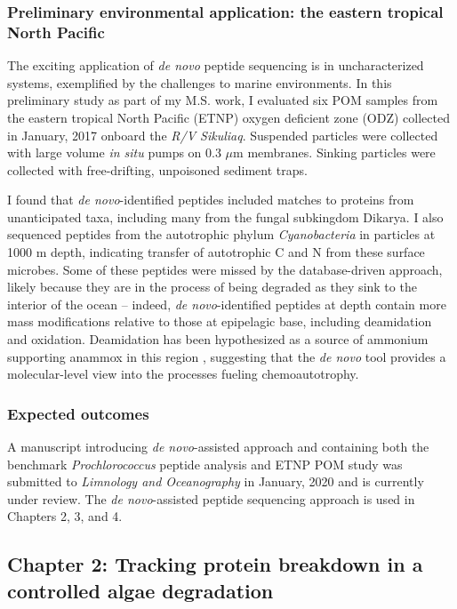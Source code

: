 \documentclass[12pt, letterpaper, twoside]{article}
\begin{document}
\subsubsection{Preliminary environmental application: the eastern tropical North Pacific}

The exciting application of \textit{de novo} peptide sequencing is in uncharacterized systems, exemplified by the challenges to marine environments. In this preliminary study as part of my M.S. work, I evaluated six POM samples from the eastern tropical North Pacific (ETNP) oxygen deficient zone (ODZ) collected in January, 2017 onboard the \textit{R/V Sikuliaq}. Suspended particles were collected with large volume \textit{in situ} pumps on 0.3 $\mu$m membranes. Sinking particles were collected with free-drifting, unpoisoned sediment traps.

I found that \textit{de novo}-identified peptides included matches to proteins from unanticipated taxa, including many from the fungal subkingdom Dikarya. I also sequenced peptides from the autotrophic phylum \textit{Cyanobacteria} in particles at 1000 m depth, indicating transfer of autotrophic C and N from these surface microbes. Some of these peptides were missed by the database-driven approach, likely because they are in the process of being degraded as they sink to the interior of the ocean – indeed, \textit{de novo}-identified peptides at depth contain more mass modifications relative to those at epipelagic base, including deamidation and oxidation. Deamidation has been hypothesized as a source of ammonium supporting anammox in this region \cite{van_mooy_impact_2002}, suggesting that the \textit{de novo} tool provides a molecular-level view into the processes fueling chemoautotrophy.

\subsubsection*{Expected outcomes}

A manuscript introducing \textit{de novo}-assisted approach and containing both the  benchmark \textit{Prochlorococcus} peptide analysis and ETNP POM study was submitted to \textit{Limnology and Oceanography} in January, 2020 and is currently under review. The \textit{de novo}-assisted peptide sequencing approach is used in Chapters 2, 3, and 4. 

\subsection{Chapter 2: Tracking protein breakdown in a controlled algae degradation}
\end{document}
